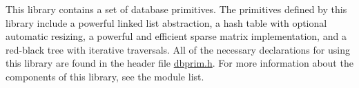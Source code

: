 This library contains a set of database primitives. The primitives defined by this library include a powerful linked list abstraction, a hash table with optional automatic resizing, a powerful and efficient sparse matrix implementation, and a red-black tree with iterative traversals. All of the necessary declarations for using this library are found in the header file \hyperlink{dbprim_8h}{dbprim.h}. For more information about the components of this library, see the module list. 